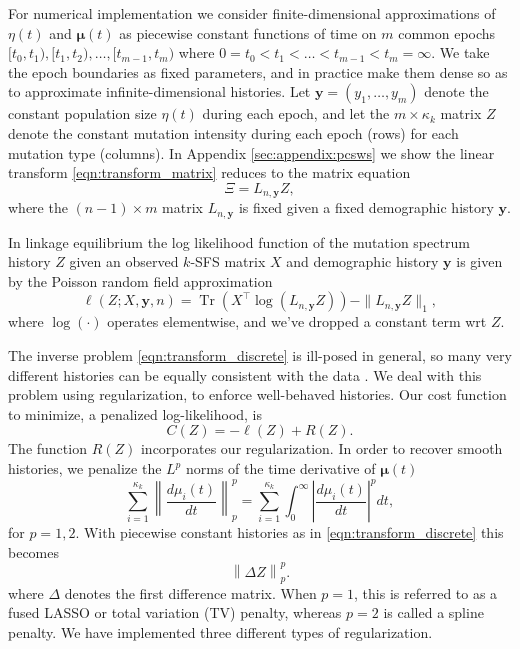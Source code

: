 \documentclass[11pt]{article}
\DeclareMathOperator{\Tr}{Tr}
\begin{document}
For numerical implementation we consider finite-dimensional approximations of $\eta(t)$ and $\boldsymbol\mu(t)$ as piecewise constant functions of time on $m$ common epochs $[t_0, t_1), [t_1, t_2),\dots, [t_{m-1}, t_m)$ where $0=t_0 < t_1 < \dots < t_{m-1} < t_m=\infty$.
We take the epoch boundaries as fixed parameters, and in practice make them dense so as to approximate infinite-dimensional histories.
Let $\boldsymbol y = (y_1,\dots,y_m)$ denote the constant population size $\eta(t)$ during each epoch, and let the $m\times\kappa_k$ matrix $Z$ denote the constant mutation intensity during each epoch (rows) for each mutation type (columns).
In Appendix \ref{sec:appendix:pcsws} we show the linear transform \eqref{eqn:transform_matrix} reduces to the matrix equation
\begin{equation}
\label{eqn:transform_discrete}
\Xi = L_{n, \boldsymbol y} Z,
\end{equation}
where the $(n-1)\times m$ matrix $L_{n, \boldsymbol y}$ is fixed given a fixed demographic history $\boldsymbol y$.

In linkage equilibrium the log likelihood function of the mutation spectrum history $Z$ given an observed $k$-SFS matrix $X$ and demographic history $\boldsymbol y$ is given by the Poisson random field approximation \citep{}
\[
\ell(Z; X, \boldsymbol y, n) = \Tr(X^\intercal\log(L_{n, \boldsymbol y} Z)) - \|L_{n, \boldsymbol y} Z\|_1,
\]
where $\log(\cdot)$ operates elementwise, and we've dropped a constant term wrt $Z$.

The inverse problem \eqref{eqn:transform_discrete} is ill-posed in general,
so many very different histories can be equally consistent with the data
\citep{oscillation paper? Yun's other papers?}.
We deal with this problem using regularization, to enforce well-behaved histories.
Our cost function to minimize, a penalized log-likelihood, is
\begin{equation}
\label{eqn:penalized}
C(Z)
= -\ell(Z) + R(Z) .
\end{equation}
The function $R(Z)$ incorporates our regularization.
In order to recover smooth histories,
we penalize the $L^p$ norms
of the time derivative of $\boldsymbol\mu(t)$
\[
\sum_{i=1}^{\kappa_k}\left\| \frac{d \mu_i(t)}{d t} \right\|_p^p
= \sum_{i=1}^{\kappa_k}\int_0^\infty\left|\frac{d\mu_i(t)}{dt}\right|^p dt,
\]
for $p=1,2$.
With piecewise constant histories as in \eqref{eqn:transform_discrete} this becomes
\[
\left\|\Delta Z \right\|_p^p.
\]
where $\Delta$ denotes the first difference matrix.
When $p = 1$, this is referred to as a fused LASSO or total variation (TV) penalty,
whereas $p=2$ is called a spline penalty.
We have implemented three different types of regularization.
\end{document}
